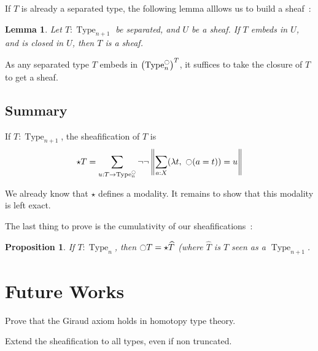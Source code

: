 \documentclass[conference]{IEEEtran}
\newtheorem{prop}[thm]{Proposition}
\newtheorem{lem}[thm]{Lemma}
\DeclareMathOperator{\Type}{Type}
\newcommand{\modal}{\ensuremath{\ocircle}}
\begin{document}
If $T$ is already a separated type, the following lemma alllows us
to build a sheaf~:
\begin{lem}
  Let $T:\Type_{n+1}$ be separated, and $U$ be a sheaf. If $T$ embeds
  in $U$, and is closed in $U$, then $T$ is a sheaf.
\end{lem}

As any separated type $T$ embeds in $\left(\Type_n^\modal\right)^T$,
it suffices to take the closure of $T$ to get a sheaf.

\subsection{Summary}
\label{ssec:summary}

If $T:\Type_{n+1}$, the sheafification of $T$ is
$$\star T = \sum_{u:T \to \Type_n^\modal} \lnot\lnot\left\| \sum_{a:X} 
            (\lambda t,~\modal (a=t)) = u\right\|$$

We already know that $\star$ defines a modality. It remains to show
that this modality is left exact.

The last thing to prove is the cumulativity of our sheafifications~:
\begin{prop}
  If $T:\Type_n$, then $\modal T = \star \widehat T$ (where $\widehat
  T$ is $T$ seen as a $\Type_{n+1}$.
\end{prop}
\section{Future Works}
\label{sec:future-works}

Prove that the Giraud axiom holds in homotopy type theory.

Extend the sheafification to all types, even if non truncated.



%
%
\end{document}
